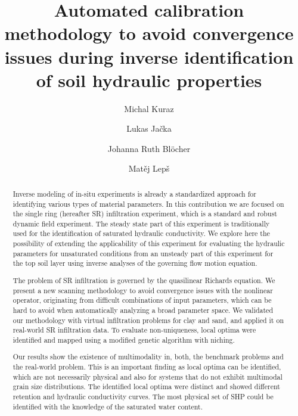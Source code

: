 \documentclass[review,times,3p,10pt]{elsarticle}
\begin{document}
\begin{frontmatter}



\title{Automated calibration methodology to avoid convergence issues during inverse identification of soil  hydraulic properties}

\author[autor1]{Michal Kuraz}

\author[autor1]{Lukas Ja\v{c}ka}

\author[autor1]{Johanna Ruth Bl\"ocher}

\author[autor2]{Mat\v{e}j Lep\v{s}}



\address[autor1]{Czech University of Life Sciences Prague, Faculty of Environmental Sciences, Department of Water Resources and Environmental Modeling}

\address[autor2]{Czech Technical University in Prague, Faculty of Civil Engineering, Department of Mechanics}

\begin{abstract}
Inverse modeling of in-situ experiments is already a standardized approach for identifying various types of material parameters. In this contribution we are focused on 
the single ring (hereafter SR) infiltration experiment, which is a standard and robust dynamic field experiment. The steady state part of this experiment is traditionally used for the identification of saturated hydraulic conductivity. We explore here the possibility of extending the applicability of this experiment for evaluating the  hydraulic parameters for unsaturated conditions from an unsteady part of this experiment for the top soil layer using inverse analyses of the governing flow motion equation.

The problem of SR infiltration is governed by the quasilinear Richards equation. We present a new scanning methodology to avoid convergence issues with the nonlinear operator, originating from difficult combinations of input parameters, which can be hard to avoid when automatically analyzing a broad parameter space. We validated our methodology with virtual infiltration problems for clay and sand, and applied it on real-world SR infiltration data. To evaluate non-uniqueness, local optima were identified and mapped using a modified genetic algorithm with niching.

Our results show the existence of multimodality in, both, the benchmark problems and the real-world problem. This is an important finding as local optima can be identified, which are not necessarily physical and also for systems that do not exhibit multimodal grain size distributions. The identified local optima were distinct and showed different retention and hydraulic conductivity curves. The most physical set of SHP could be identified with the knowledge of the saturated water content. 





\end{abstract}
\end{frontmatter}
\end{document}
